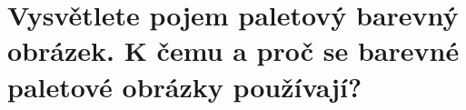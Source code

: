 \section{Vysvětlete pojem paletový barevný obrázek. K čemu a proč se barevné paletové obrázky používají?}